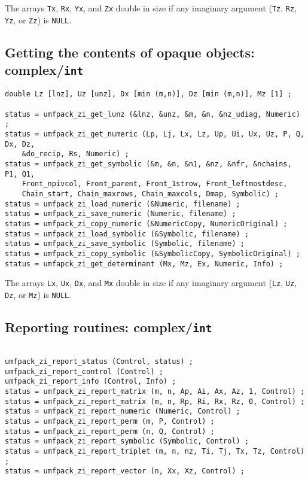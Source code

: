 \documentclass[11pt]{article}
\begin{document}
The arrays {\tt Tx}, {\tt Rx}, {\tt Yx}, and {\tt Zx} double in size if
any imaginary argument ({\tt Tz}, {\tt Rz}, {\tt Yz}, or {\tt Zz}) is {\tt NULL}.

\subsection{Getting the contents of opaque objects: complex/{\tt int}}

{\footnotesize
\begin{verbatim}
double Lz [lnz], Uz [unz], Dx [min (m,n)], Dz [min (m,n)], Mz [1] ;

status = umfpack_zi_get_lunz (&lnz, &unz, &m, &n, &nz_udiag, Numeric) ;
status = umfpack_zi_get_numeric (Lp, Lj, Lx, Lz, Up, Ui, Ux, Uz, P, Q, Dx, Dz,
    &do_recip, Rs, Numeric) ;
status = umfpack_zi_get_symbolic (&m, &n, &n1, &nz, &nfr, &nchains, P1, Q1,
    Front_npivcol, Front_parent, Front_1strow, Front_leftmostdesc,
    Chain_start, Chain_maxrows, Chain_maxcols, Dmap, Symbolic) ;
status = umfpack_zi_load_numeric (&Numeric, filename) ;
status = umfpack_zi_save_numeric (Numeric, filename) ;
status = umfpack_zi_copy_numeric (&NumericCopy, NumericOriginal) ;
status = umfpack_zi_load_symbolic (&Symbolic, filename) ;
status = umfpack_zi_save_symbolic (Symbolic, filename) ;
status = umfpack_zi_copy_symbolic (&SymbolicCopy, SymbolicOriginal) ;
status = umfapck_zi_get_determinant (Mx, Mz, Ex, Numeric, Info) ;
\end{verbatim}
}

The arrays {\tt Lx}, {\tt Ux}, {\tt Dx}, and {\tt Mx} double in size if
any imaginary argument ({\tt Lz}, {\tt Uz}, {\tt Dz}, or {\tt Mz}) is {\tt NULL}.

\subsection{Reporting routines: complex/{\tt int}}

{\footnotesize
\begin{verbatim}

umfpack_zi_report_status (Control, status) ;
umfpack_zi_report_control (Control) ;
umfpack_zi_report_info (Control, Info) ;
status = umfpack_zi_report_matrix (m, n, Ap, Ai, Ax, Az, 1, Control) ;
status = umfpack_zi_report_matrix (m, n, Rp, Ri, Rx, Rz, 0, Control) ;
status = umfpack_zi_report_numeric (Numeric, Control) ;
status = umfpack_zi_report_perm (m, P, Control) ;
status = umfpack_zi_report_perm (n, Q, Control) ;
status = umfpack_zi_report_symbolic (Symbolic, Control) ;
status = umfpack_zi_report_triplet (m, n, nz, Ti, Tj, Tx, Tz, Control) ;
status = umfpack_zi_report_vector (n, Xx, Xz, Control) ;
\end{verbatim}
}
\end{document}
